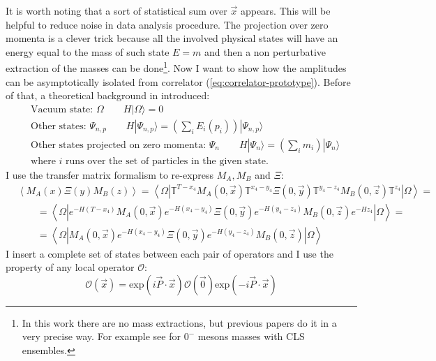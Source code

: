\documentclass[english, LaM, oneside, noexaminfo]{sapthesis}
\newcommand{\la}{\langle}
\newcommand{\ra}{\rangle}
\begin{document}
It is worth noting that a sort of statistical sum over $\vec x$ appears. This will be helpful to reduce noise in data analysis procedure.
The projection over zero momenta is a clever trick because all the involved physical states will have an energy equal to the mass of such state $E=m$ and then a non perturbative extraction of the masses can be done\footnote{In this work there are no mass extractions, but previous papers do it in a very precise way. For example see \cite{LightMesons}\cite{OBC-tm} for $0^{-}$ mesons masses with CLS ensembles.}.
\newline
Now I want to show how the amplitudes can be asymptotically isolated \cite{montvay-munster} from correlator (\ref{eq:correlator-prototype}).
Before of that, a theoretical background in introduced:
\begin{equation*}
    \begin{split}
        & \text{Vacuum state: } \Omega \qquad H|\Omega\ra = 0 \\
        & \text{Other states: } \Psi_{n,p} \qquad H|\Psi_{n,p}\ra = \left(\sum_i E_i(p_i)\right)|\Psi_{n,p}\ra \\
        & \text{Other states projected on zero momenta: } \Psi_{n} \qquad H|\Psi_{n}\ra = \left(\sum_i m_i\right)|\Psi_{n}\ra \\
        & \text{where $i$ runs over the set of particles in the given state.}
    \end{split}
\end{equation*}
I use the transfer matrix formalism to re-express $M_A, M_B$ and $\Xi$:
\begin{equation*}
    \begin{split}
        & \left\la M_A (x)\Xi (y)M_B (z) \right\ra = \left\la \Omega | \mathbb{T}^{T-x_4} M_A (0,\vec x) \mathbb{T}^{x_4-y_4} \Xi (0,\vec y) \mathbb{T}^{y_4-z_4} M_B (0,\vec z) \mathbb{T}^{z_4} | \Omega \right\ra = \\
        & \qquad = \left\la \Omega | e^{-H(T-x_4)} M_A (0,\vec x) e^{-H(x_4-y_4)} \Xi (0,\vec y) e^{-H(y_4-z_4)} M_B (0,\vec z) e^{-Hz_4} | \Omega \right\ra = \\
        & \qquad = \left\la \Omega | M_A (0,\vec x) e^{-H(x_4-y_4)} \Xi (0,\vec y) e^{-H(y_4-z_4)} M_B (0,\vec z) | \Omega \right\ra
    \end{split}
\end{equation*}
I insert a complete set of states between each pair of operators and I use the property of any local operator $\mathcal{O}$:
$$\mathcal{O}(\vec x) = \text{exp}\left(i \vec P \cdot \vec x\right)\mathcal{O}(\vec 0)\text{exp}\left(-i \vec P \cdot \vec x\right)$$
\end{document}
